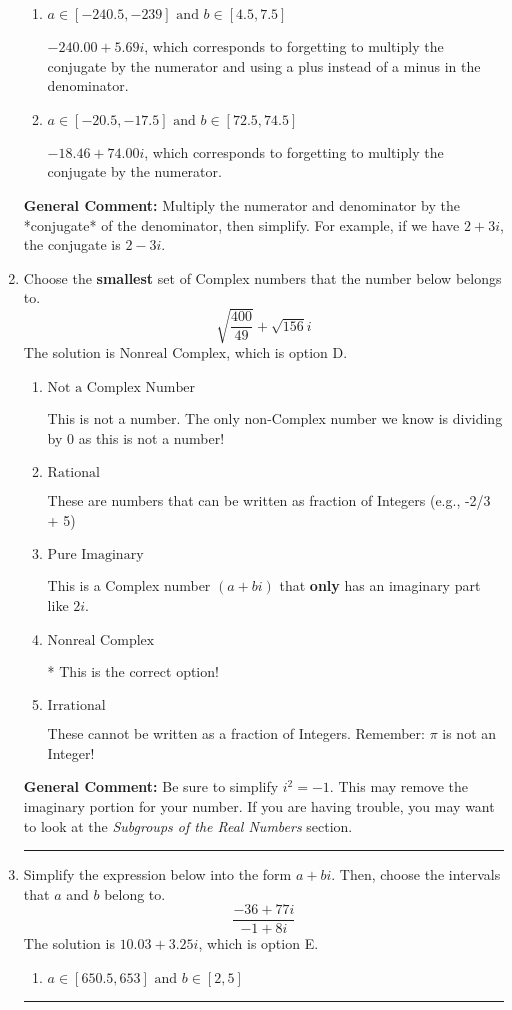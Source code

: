 \documentclass{extbook}[14pt]
\newcommand{\litem}[1]{\item #1

\rule{\textwidth}{0.4pt}}
\begin{document}
\begin{enumerate}
{\begin{enumerate}[label=\Alph*.]
* $-18.46  + 5.69 i$, which is the correct option.
\item \( a \in [-240.5, -239] \text{ and } b \in [4.5, 7.5] \)

 $-240.00  + 5.69 i$, which corresponds to forgetting to multiply the conjugate by the numerator and using a plus instead of a minus in the denominator.
\item \( a \in [-20.5, -17.5] \text{ and } b \in [72.5, 74.5] \)

 $-18.46  + 74.00 i$, which corresponds to forgetting to multiply the conjugate by the numerator.
\end{enumerate}

\textbf{General Comment:} Multiply the numerator and denominator by the *conjugate* of the denominator, then simplify. For example, if we have $2+3i$, the conjugate is $2-3i$.
}
\litem{
Choose the \textbf{smallest} set of Complex numbers that the number below belongs to.
\[ \sqrt{\frac{400}{49}}+\sqrt{156} i \]The solution is \( \text{Nonreal Complex} \), which is option D.\begin{enumerate}[label=\Alph*.]
\item \( \text{Not a Complex Number} \)

This is not a number. The only non-Complex number we know is dividing by 0 as this is not a number!
\item \( \text{Rational} \)

These are numbers that can be written as fraction of Integers (e.g., -2/3 + 5)
\item \( \text{Pure Imaginary} \)

This is a Complex number $(a+bi)$ that \textbf{only} has an imaginary part like $2i$.
\item \( \text{Nonreal Complex} \)

* This is the correct option!
\item \( \text{Irrational} \)

These cannot be written as a fraction of Integers. Remember: $\pi$ is not an Integer!
\end{enumerate}

\textbf{General Comment:} Be sure to simplify $i^2 = -1$. This may remove the imaginary portion for your number. If you are having trouble, you may want to look at the \textit{Subgroups of the Real Numbers} section.
}
\litem{
Simplify the expression below into the form $a+bi$. Then, choose the intervals that $a$ and $b$ belong to.
\[ \frac{-36 + 77 i}{-1 + 8 i} \]The solution is \( 10.03  + 3.25 i \), which is option E.\begin{enumerate}[label=\Alph*.]
\item \( a \in [650.5, 653] \text{ and } b \in [2, 5] \)


\end{enumerate}}
\end{enumerate}
\end{document}
